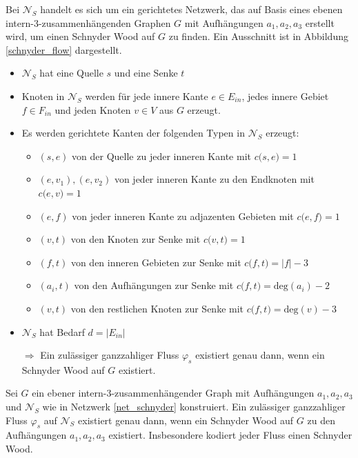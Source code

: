 \begin{network}\label{net_schnyder}
Bei $\mathcal{N}_S$ handelt es sich um ein gerichtetes Netzwerk, das auf Basis eines ebenen intern-3-zusammenhängenden Graphen $G$ mit Aufhängungen $a_1,a_2,a_3$ erstellt wird, um einen Schnyder Wood auf $G$ zu finden. Ein Ausschnitt ist in Abbildung \ref{schnyder_flow} dargestellt.
	\begin{itemize}
	\item $\mathcal{N}_S$ hat eine Quelle $s$ und eine Senke $t$
	\item Knoten in $\mathcal{N}_S$ werden für jede innere Kante $e \in E_{in}$, jedes innere Gebiet $f\in F_{in}$ und jeden Knoten $v \in V$ aus $G$ erzeugt.
	\item Es werden gerichtete Kanten der folgenden Typen in $\mathcal{N}_S$ erzeugt:
		\begin{itemize}
		\item $(s,e)$ von der Quelle zu jeder inneren Kante mit $c\big(s,e\big) = 1$
		\item $(e,v_1),(e,v_2)$ von jeder inneren Kante zu den Endknoten mit $c\big(e,v\big) = 1$
		\item $(e,f)$ von jeder inneren Kante zu adjazenten Gebieten mit $c\big(e,f\big) = 1$
		\item $(v,t)$ von den Knoten zur Senke mit $c\big(v,t\big) = 1$
		\item $(f,t)$ von den inneren Gebieten zur Senke mit $c\big(f,t\big) = |f|-3$
		\item $(a_i,t)$ von den Aufhängungen zur Senke mit $c\big(f,t\big) = \text{deg}(a_i)-2$
		\item $(v,t)$ von den restlichen Knoten zur Senke mit $c\big(f,t\big) = \text{deg}(v)-3$
		\end{itemize}
	\item $\mathcal{N}_S$ hat Bedarf $d=|E_{in}|$
	\item [$\Rightarrow$] Ein zulässiger ganzzahliger Fluss $\varphi_s$ existiert genau dann, wenn ein Schnyder Wood  auf $G$ existiert.
	\end{itemize}
\end{network}

\begin{proposition}
Sei $G$ ein ebener intern-3-zusammenhängender Graph mit Aufhängungen $a_1,a_2,a_3$ und $\mathcal{N}_S$ wie in Netzwerk \ref{net_schnyder} konstruiert. Ein zulässiger ganzzahliger Fluss $\varphi_s$ auf $\mathcal{N}_S$ existiert genau dann, wenn ein Schnyder Wood auf $G$ zu den Aufhängungen $a_1,a_2,a_3$ existiert. Insbesondere kodiert jeder Fluss einen Schnyder Wood.
\end{proposition}

